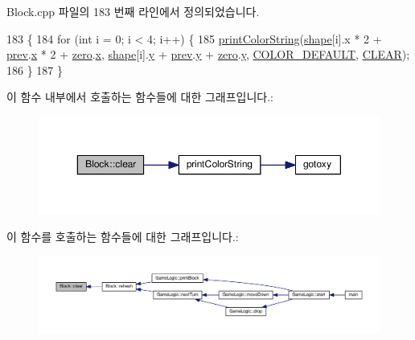 Block.\+cpp 파일의 183 번째 라인에서 정의되었습니다.


\begin{DoxyCode}
183                   \{
184     \textcolor{keywordflow}{for} (\textcolor{keywordtype}{int} i = 0; i < 4; i++) \{
185         \hyperlink{myio_8cpp_afce36429cc875312f4476969820ebb51}{printColorString}(\hyperlink{class_block_ae1a4e97236e1e5f04d21fc9227b8c3a8}{shape}[i].x * 2 + \hyperlink{class_block_ab86ce4753987a3eb39058553fd81b462}{prev}.\hyperlink{struct_point_a8c779e11e694b20e0946105a9f5de842}{x} * 2 + 
      \hyperlink{class_block_ad456f4794a480711f7057e1f270d93c2}{zero}.\hyperlink{struct_point_a8c779e11e694b20e0946105a9f5de842}{x}, \hyperlink{class_block_ae1a4e97236e1e5f04d21fc9227b8c3a8}{shape}[i].\hyperlink{struct_point_a2e1b5fb2b2a83571f5c0bc0f66a73cf7}{y} + \hyperlink{class_block_ab86ce4753987a3eb39058553fd81b462}{prev}.\hyperlink{struct_point_a2e1b5fb2b2a83571f5c0bc0f66a73cf7}{y} + \hyperlink{class_block_ad456f4794a480711f7057e1f270d93c2}{zero}.\hyperlink{struct_point_a2e1b5fb2b2a83571f5c0bc0f66a73cf7}{y}, \hyperlink{myio_8h_a56e1aea61ee305e3648158362333b3a8}{COLOR\_DEFAULT}, 
      \hyperlink{class_block_a11bcda9589b54be35a8905ca7be7310e}{CLEAR});
186     \}
187 \}
\end{DoxyCode}


이 함수 내부에서 호출하는 함수들에 대한 그래프입니다.\+:
\nopagebreak
\begin{figure}[H]
\begin{center}
\leavevmode
\includegraphics[width=350pt]{class_block_ab2f8596ed64d7d4fc1ce6cbd739173de_cgraph}
\end{center}
\end{figure}




이 함수를 호출하는 함수들에 대한 그래프입니다.\+:
\nopagebreak
\begin{figure}[H]
\begin{center}
\leavevmode
\includegraphics[width=350pt]{class_block_ab2f8596ed64d7d4fc1ce6cbd739173de_icgraph}
\end{center}
\end{figure}


